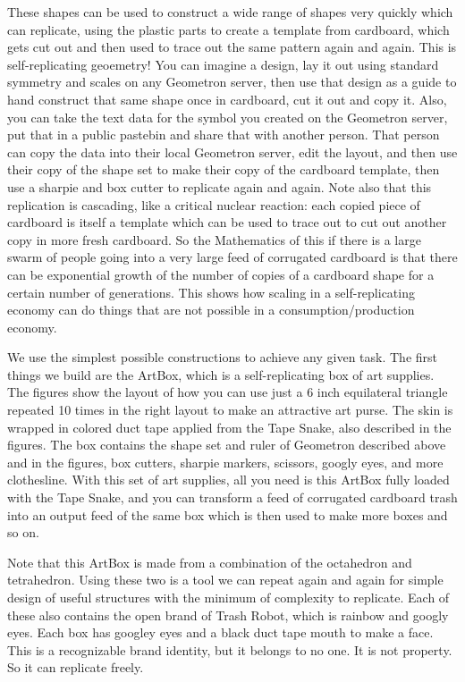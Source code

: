 These shapes can be used to construct a wide range of shapes very quickly which can replicate, using the plastic parts to create a template from cardboard, which gets cut out and then used to trace out the same pattern again and again.   This is self-replicating geoemetry!  You can imagine a design, lay it out using standard symmetry and scales on any Geometron server, then use that design as a guide to hand construct that same shape once in cardboard, cut it out and copy it.  Also, you can take the text data for the symbol you created on the Geometron server, put that in a public pastebin and share that with another person.  That person can copy the data into their local Geometron server, edit the layout, and then use their copy of the shape set to make their copy of the cardboard template, then use a sharpie and box cutter to replicate again and again.  Note also that this replication is cascading, like a critical nuclear reaction: each copied piece of cardboard is itself a template which can be used to trace out to cut out another copy in more fresh cardboard.  So the Mathematics of this if there is a large swarm of people going into a very large feed of corrugated cardboard is that there can be exponential growth of the number of copies of a cardboard shape for a certain number of generations.  This shows how scaling in a self-replicating economy can do things that are not possible in a consumption/production economy.

We use the simplest possible constructions to achieve any given task.  The first things we build are the ArtBox, which is a self-replicating box of art supplies. The figures show the layout of how you can use just a 6 inch equilateral triangle repeated 10 times in the right layout to make an attractive art purse.  The skin is wrapped in colored duct tape applied from the Tape Snake, also described in the figures.  The box contains the shape set and ruler of Geometron described above and in the figures, box cutters, sharpie markers, scissors, googly eyes, and more clothesline.  With this set of art supplies, all you need is this ArtBox fully loaded with the Tape Snake, and you can transform a feed of corrugated cardboard trash into an output feed of the same box which is then used to make more boxes and so on.  

Note that this ArtBox is made from a combination of the octahedron and tetrahedron.  Using these two is a tool we can repeat again and again for simple design of useful structures with the minimum of complexity to replicate.  Each of these also contains the open brand of Trash Robot, which is rainbow and googly eyes.  Each box has googley eyes and a black duct tape mouth to make a face.  This is a recognizable brand identity, but it belongs to no one.  It is not property.  So it can replicate freely.

